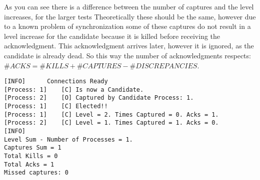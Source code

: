 As you can see there is a difference between the number of captures and the level increases, for the larger tests Theoretically these should be the same, however due to a known problem of synchronization some of these captures do not result in a level increase for the candidate because it is killed before receiving the acknowledgment. This acknowledgment arrives later, however it is ignored, as the candidate is already dead. So this way the number of acknowledgments respects: $\#ACKS = \#KILLS+\#CAPTURES-\#DISCREPANCIES$.

\vspace{10pt}

\begin{Verbatim}[frame=single,label=Test 1 output]
[INFO]	  	Connections Ready
[Process: 1]	[C]	Is now a Candidate.
[Process: 2]	[O]	Captured by Candidate Process: 1.
[Process: 1]	[C]	Elected!! 
[Process: 1]	[C]	Level = 2. Times Captured = 0. Acks = 1.
[Process: 2]	[C]	Level = 1. Times Captured = 1. Acks = 0.
[INFO]		
Level Sum - Number of Processes = 1.	
Captures Sum = 1	
Total Kills = 0	
Total Acks = 1
Missed captures: 0
\end{Verbatim}

\newpage

